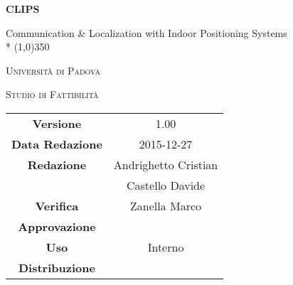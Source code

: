 \documentclass[a4paper,12pt]{article}
\author{Andrighetto Cristian, Castello Davide}
\date{27/12/2015}
\begin{document}
	\begin{titlepage}
		\centering
		{\huge\bfseries CLIPS\par}
		Communication \& Localization with Indoor Positioning Systems \\*
		\line(1,0){350} \\
		{\scshape\LARGE Università di Padova \par}
		\vspace{1cm}
		{\scshape\Large Studio di Fattibilità \par}
		\logo
		\newpage
		\begin{tabular}{c|c}
			{\hfill \textbf{Versione}} 			& 1.00			\\
			{\hfill\textbf{Data Redazione}} 		& 2015-12-27  		\\ 
			{\hfill\textbf{Redazione}} 			&  Andrighetto Cristian \\ 
			& Castello Davide       \\
			{\hfill\textbf{Verifica}} 				&  Zanella Marco   \\
			{\hfill\textbf{Approvazione}} 		&  \\
			{\hfill\textbf{Uso}} 					& Interno			\\
			{\hfill\textbf{Distribuzione}} 			& \leaf			\\
		\end{tabular}
    \end{titlepage}
	
	\newpage
		\pagestyle{myfront}
		
	
	\newpage
		\tableofcontents
	
	\label{LastFrontPage}
	
	\newpage
	\pagestyle{mymain}
		
	\newpage
		
	\newpage
		
	\newpage
		
\label{LastPage}
\end{document}
